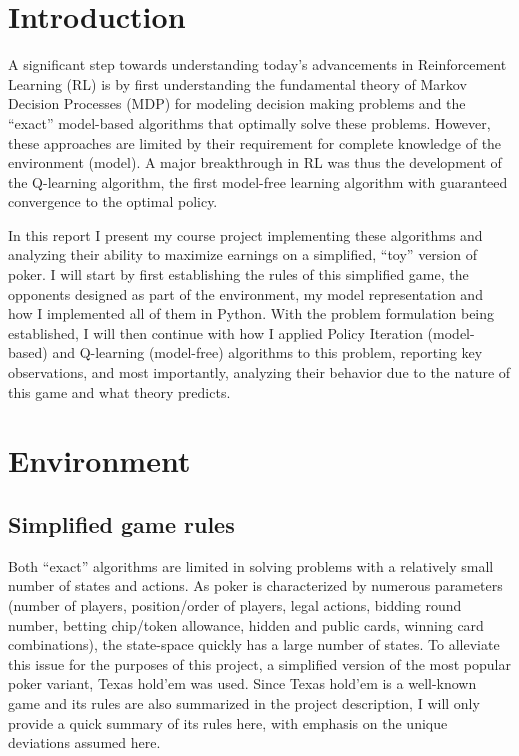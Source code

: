 \section{Introduction}

A significant step towards understanding today's advancements in Reinforcement Learning (RL) is by first understanding the fundamental theory of Markov Decision Processes (MDP) for modeling decision making problems and the ``exact'' model-based algorithms that optimally solve these problems. However, these approaches are limited by their requirement for complete knowledge of the environment (model). A major breakthrough in RL was thus the development of the Q-learning algorithm, the first model-free learning algorithm with guaranteed convergence to the optimal policy.

In this report I present my course project implementing these algorithms and analyzing their ability to maximize earnings on a simplified, ``toy'' version of poker. I will start by first establishing the rules of this simplified game, the opponents designed as part of the environment, my model representation and how I implemented all of them in Python. With the problem formulation being established, I will then continue with how I applied Policy Iteration (model-based) and Q-learning (model-free) algorithms to this problem, reporting key observations, and most importantly, analyzing their behavior due to the nature of this game and what theory predicts.

\section{Environment}

\subsection{Simplified game rules}

Both ``exact'' algorithms are limited in solving problems with a relatively small number of states and actions. As poker is characterized by numerous parameters (number of players, position/order of players, legal actions, bidding round number, betting chip/token allowance, hidden and public cards, winning card combinations), the state-space quickly has a large number of states. To alleviate this issue for the purposes of this project, a simplified version of the most popular poker variant, Texas hold'em was used. Since Texas hold'em is a well-known game and its rules are also summarized in the project description, I will only provide a quick summary of its rules here, with emphasis on the unique deviations assumed here.

